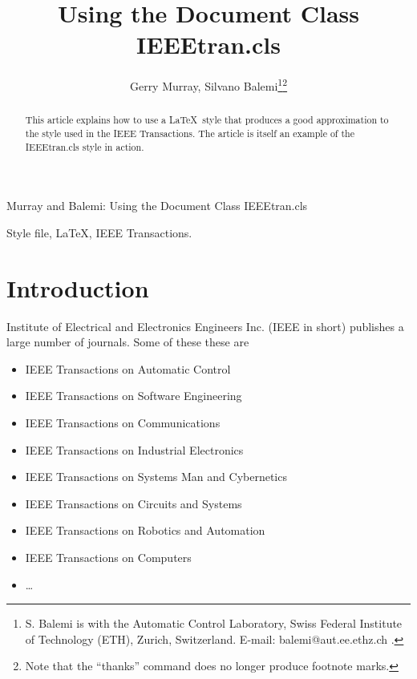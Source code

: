 \documentclass[twocolumn]{IEEEtran} %
\begin{document}
\title{Using the Document Class IEEEtran.cls} %

\author{Gerry Murray, Silvano Balemi\thanks{S. Balemi is with the
Automatic Control Laboratory, Swiss Federal Institute of Technology
(ETH), Zurich, Switzerland. E-mail: balemi@aut.ee.ethz.ch .}\thanks{Note
that the ``thanks'' command does no longer produce footnote marks.}}

{Murray and Balemi: Using the Document Class IEEEtran.cls} %

\maketitle

\begin{abstract}
This article explains how to use a \LaTeX\ style that produces a good
approximation to the style used in the IEEE Transactions.  The article
is itself an example of the IEEEtran.cls style in action.
\end{abstract}

\begin{keywords}
Style file, \LaTeX, IEEE Transactions.
\end{keywords}

\section{Introduction}
 Institute of Electrical and Electronics Engineers
Inc. (IEEE in short) publishes a large number of journals.  Some of
these these are

\begin{itemize}
\item IEEE Transactions on Automatic Control
\item IEEE Transactions on Software Engineering
\item IEEE Transactions on Communications
\item IEEE Transactions on Industrial Electronics
\item IEEE Transactions on Systems Man and Cybernetics
\item IEEE Transactions on Circuits and Systems
\item IEEE Transactions on Robotics and Automation
\item IEEE Transactions on Computers
\item \ldots{}
\end{itemize}
\end{document}
